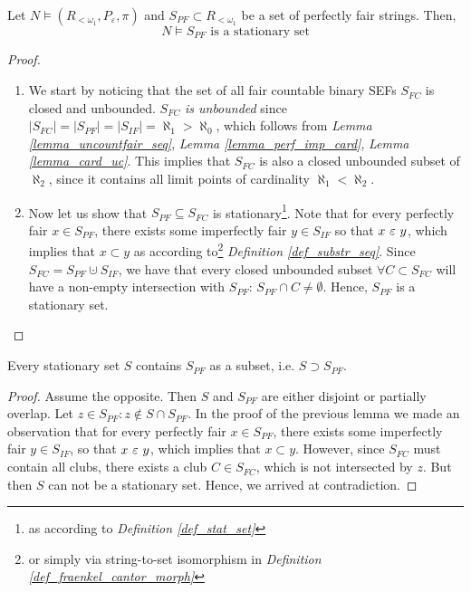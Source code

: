 \begin{lemma}\label{lemma_spf_stat}
    Let $N \models (R_{<\omega_1}, P_\varepsilon, \pi)$ and $S_{PF} \subset R_{<\omega_1}$ be a set of perfectly fair strings. Then,
         \[ N \models S_{PF} \text{ is a stationary set} \]
\end{lemma}
\begin{proof}
    \begin{enumerate}
        \item We start by noticing that the set of all fair countable binary SEFs $S_{FC}$ is closed and unbounded. $S_{FC}$ \textit{is unbounded} since $|S_{FC}| = |S_{PF}| = |S_{IF}| = \aleph_1 > \aleph_0$, which follows from \textit{Lemma \ref{lemma_uncountfair_seq}}, \textit{Lemma \ref{lemma_perf_imp_card}}, \textit{Lemma \ref{lemma_card_uc}}. This implies that $S_{FC}$ is also a closed unbounded subset of $\aleph_2$, since it contains all limit points of cardinality $\aleph_1 < \aleph_2$.
        \item Now let us show that  $S_{PF} \subseteq S_{FC}$ is stationary\footnote{as according to \textit{Definition \ref{def_stat_set}}}. Note that for every perfectly fair $x \in S_{PF}$, there exists some imperfectly fair $y \in S_{IF}$ so that $x \ \varepsilon\  y$, which implies that $x \subset y$ as according to\footnote{or simply via string-to-set isomorphism in \textit{Definition \ref{def_fraenkel_cantor_morph}}} \textit{Definition \ref{def_substr_seq}}. Since $S_{FC} = S_{PF} \cupdot S_{IF}$, we have that every closed unbounded subset $\forall C \subset S_{FC}$ will have a non-empty intersection with $S_{PF}$: $S_{PF} \cap C \neq \emptyset$. Hence, $S_{PF}$ is a stationary set.
    \end{enumerate}
\end{proof}

\begin{corollary}\label{corollary_perfect_stat_subset}
    Every stationary set $S$ contains $S_{PF}$ as a subset, i.e. $S \supset S_{PF}$.
\end{corollary}
\begin{proof}
    Assume the opposite. Then $S$ and $S_{PF}$ are either disjoint or partially overlap. Let $z \in S_{PF}: z \notin S \cap S_{PF}$. In the proof of the previous lemma we made an observation that for every perfectly fair $x \in S_{PF}$, there exists some imperfectly fair $y \in S_{IF}$, so that $x \ \varepsilon\  y$, which implies that $x \subset y$. However, since $S_{FC}$ must contain all clubs, there exists a club $C \in S_{FC}$, which is not intersected by $z$. But then $S$ can not be a stationary set. Hence, we arrived at contradiction.
\end{proof}


